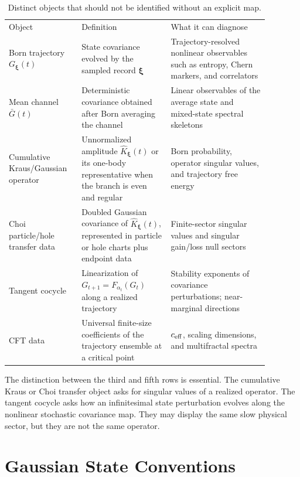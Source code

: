 \documentclass[aps,prb,onecolumn,nofootinbib,superscriptaddress]{revtex4-2}
\newcommand{\bxi}{{\boldsymbol{\xi}}}
\theoremstyle{plain}
\theoremstyle{definition}
\begin{document}
\begin{table}[h]
\caption{\label{tab:dictionary}
Distinct objects that should not be identified without an explicit map.}
\begin{ruledtabular}
\begin{tabular}{p{0.23\linewidth}p{0.31\linewidth}p{0.34\linewidth}}
Object & Definition & What it can diagnose \\
\colrule
Born trajectory \(G_\bxi(t)\) &
State covariance evolved by the sampled record \(\bxi\) &
Trajectory-resolved nonlinear observables such as entropy, Chern markers, and
correlators \\
Mean channel \(\bar G(t)\) &
Deterministic covariance obtained after Born averaging the channel &
Linear observables of the average state and mixed-state spectral skeletons \\
Cumulative Kraus/Gaussian operator &
Unnormalized amplitude \(\hat K_\bxi(t)\) or its one-body representative when
the branch is even and regular &
Born probability, operator singular values, and trajectory free energy \\
Choi particle/hole transfer data &
Doubled Gaussian covariance of \(\hat K_\bxi(t)\), represented in particle or
hole charts plus endpoint data &
Finite-sector singular values and singular gain/loss null sectors \\
Tangent cocycle &
Linearization of \(G_{t+1}=F_{\alpha_t}(G_t)\) along a realized trajectory &
Stability exponents of covariance perturbations; near-marginal directions \\
CFT data &
Universal finite-size coefficients of the trajectory ensemble at a critical
point &
\(c_{\rm eff}\), scaling dimensions, and multifractal spectra \\
\end{tabular}
\end{ruledtabular}
\end{table}

The distinction between the third and fifth rows is essential.  The cumulative
Kraus or Choi transfer object asks for singular values of a realized operator.
The tangent cocycle asks how an infinitesimal state perturbation evolves along
the nonlinear stochastic covariance map.  They may display the same slow
physical sector, but they are not the same operator.

\section{Gaussian State Conventions}
\label{sec:gaussian-state-conventions}
\end{document}

